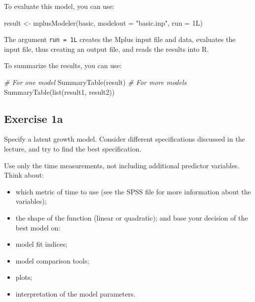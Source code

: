 \documentclass[
]{book}
\newenvironment{Shaded}{\begin{snugshade}}{\end{snugshade}}
\newcommand{\AttributeTok}[1]{\textcolor[rgb]{0.77,0.63,0.00}{#1}}
\newcommand{\CommentTok}[1]{\textcolor[rgb]{0.56,0.35,0.01}{\textit{#1}}}
\newcommand{\FunctionTok}[1]{\textcolor[rgb]{0.00,0.00,0.00}{#1}}
\newcommand{\NormalTok}[1]{#1}
\newcommand{\OtherTok}[1]{\textcolor[rgb]{0.56,0.35,0.01}{#1}}
\newcommand{\StringTok}[1]{\textcolor[rgb]{0.31,0.60,0.02}{#1}}
\providecommand{\tightlist}{%
  \setlength{\itemsep}{0pt}\setlength{\parskip}{0pt}}
\begin{document}
To evaluate this model, you can use:

\begin{Shaded}
\begin{Highlighting}[]
\NormalTok{result }\OtherTok{\textless{}{-}} \FunctionTok{mplusModeler}\NormalTok{(basic, }\AttributeTok{modelout =} \StringTok{"basic.inp"}\NormalTok{, }\AttributeTok{run =}\NormalTok{ 1L)}
\end{Highlighting}
\end{Shaded}

The argument \texttt{run\ =\ 1L} creates the Mplus input file and data, evaluates the input file, thus creating an output file, and reads the results into R.

To summarize the results, you can use:

\begin{Shaded}
\begin{Highlighting}[]
\CommentTok{\# For one model}
\FunctionTok{SummaryTable}\NormalTok{(result)}
\CommentTok{\# For more models}
\FunctionTok{SummaryTable}\NormalTok{(}\FunctionTok{list}\NormalTok{(result1, result2))}
\end{Highlighting}
\end{Shaded}

\hypertarget{exercise-1a}{%
\subsection{Exercise 1a}\label{exercise-1a}}

Specify a latent growth model. Consider different specifications discussed in the lecture, and try to find the best specification.

Use only the time measurements, not including additional
predictor variables.\\
Think about:

\begin{itemize}
\tightlist
\item
  which metric of time to use (see the SPSS file for more information about the variables);
\item
  the shape of the function (linear or quadratic);
  and base your decision of the best model on:\\
\item
  model fit indices;
\item
  model comparison tools;
\item
  plots;
\item
  interpretation of the model parameters.
\end{itemize}
\end{document}
